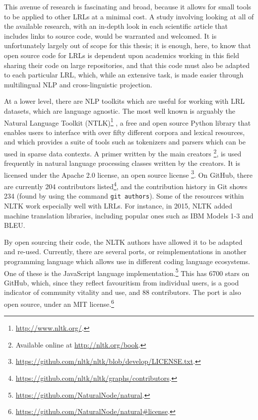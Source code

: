 This avenue of research is fascinating and broad, because it allows for small tools to be applied to other LRLs at a minimal cost. A study involving looking at all of the available research, with an in-depth look in each scientific article that includes links to source code, would be warranted and welcomed. It is unfortunately largely out of scope for this thesis; it is enough, here, to know that open source code for LRLs is dependent upon academics working in this field sharing their code on large repositories, and that this code must also be adapted to each particular LRL, which, while an extensive task, is made easier through multilingual NLP and cross-linguistic projection.

At a lower level, there are NLP toolkits which are useful for working with LRL datasets, which are language agnostic. The most well known is arguably the Natural Language Toolkit (NTLK)\footnote{\href{http://www.nltk.org/}{http://www.nltk.org/}. } \citep{bird2006nltk}, a free and open source Python library that enables users to interface with over fifty different corpora and lexical resources, and which provides a suite of tools such as tokenizers and parsers which can be used in sparse data contexts. A primer written by the main creators \citep{bird2009natural}\footnote{Available online at \href{http://nltk.org/book}{http://nltk.org/book}. }, is used frequently in natural language processing classes written by the creators. It is licensed under the Apache 2.0 license, an open source license \footnote{\href{https://github.com/nltk/nltk/blob/develop/LICENSE.txt}{https://github.com/nltk/nltk/blob/develop/LICENSE.txt}. }. On GitHub, there are currently 204 contributors listed\footnote{\href{https://github.com/nltk/nltk/graphs/contributors}{https://github.com/nltk/nltk/graphs/contributors}. }, and the contribution history in Git shows 234 (found by using the command {\tt git authors}). Some of the resources within NLTK work especially well with LRLs. For instance, in 2015, NLTK added machine translation libraries, including popular ones such as IBM Models 1-3 and BLEU.

By open sourcing their code, the NLTK authors have allowed it to be adapted and re-used. Currently, there are several ports, or reimplementations in another programming language which allows use in different coding language ecosystems. One of these is the JavaScript language implementation.\footnote{\href{https://github.com/NaturalNode/natural}{https://github.com/NaturalNode/natural}. } This has 6700 stars on GitHub, which, since they reflect favouritism from individual users, is a good indicator of community vitality and use, and 88 contributors. The port is also open source, under an MIT license.\footnote{\href{https://github.com/NaturalNode/natural\#license}{https://github.com/NaturalNode/natural\#license}. }


